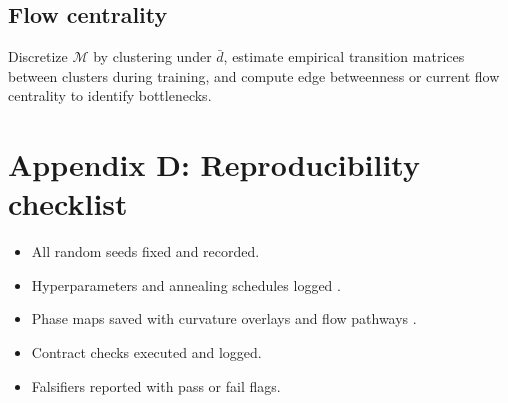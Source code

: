 \documentclass[11pt]{article}
\newcommand{\1}{\mathbbm{1}}
\begin{document}
\subsection{Flow centrality}
Discretize $\mathcal{M}$ by clustering under $\bar d$, estimate empirical transition matrices between clusters during training, and compute edge betweenness or current flow centrality to identify bottlenecks.

\section{Appendix D: Reproducibility checklist}
\begin{itemize}[leftmargin=2em]
    \item All random seeds fixed and recorded.
    \item Hyperparameters and annealing schedules logged \parencite{Borkar2008}.
    \item Phase maps saved with curvature overlays and flow pathways \parencite{CoverThomas2006}.
    \item Contract checks executed and logged.
    \item Falsifiers reported with pass or fail flags.
\end{itemize}

\printbibliography
\end{document}
